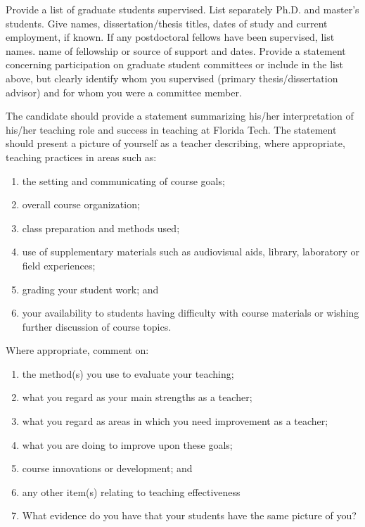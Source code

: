 Provide a list of graduate students supervised. List separately Ph.D. and master’s students. Give names, dissertation/thesis titles, dates of study and current employment, if known. If any postdoctoral fellows have been supervised, list names. name of fellowship or source of support and dates. Provide a statement concerning participation on graduate student committees or include in the list above, but clearly identify whom you supervised (primary thesis/dissertation advisor) and for whom you were a committee member.

The candidate should provide a statement summarizing his/her interpretation of his/her teaching role and success in teaching at Florida Tech. The statement should present a picture of yourself as a teacher describing, where appropriate, teaching practices in areas such as:
\begin{enumerate}
\item the setting and communicating of course goals;
\item overall course organization;
\item class preparation and methods used;
\item use of supplementary materials such as audiovisual aids, library, laboratory or field experiences;
\item grading your student work; and
\item your availability to students having difficulty with course materials or wishing further discussion of course topics.
\end{enumerate}

Where appropriate, comment on:

\begin{enumerate}
\item the method(s) you use to evaluate your teaching;
\item what you regard as your main strengths as a teacher;
\item what you regard as areas in which you need improvement as a teacher;
\item what you are doing to improve upon these goals;
\item course innovations or development; and
\item any other item(s) relating to teaching effectiveness
\item What evidence do you have that your students have the same picture of you?

\end{enumerate}

